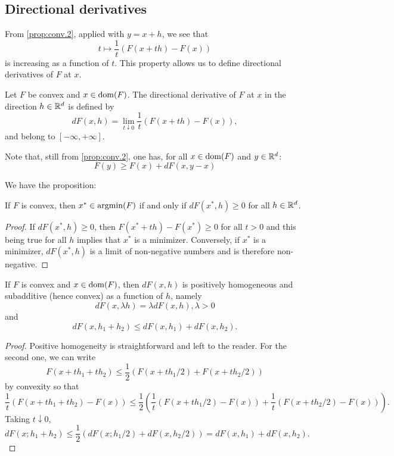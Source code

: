 \subsection{Directional derivatives}
From \cref{prop:conv.2}, applied with $y = x+h$, we see that 
\[
t \mapsto \frac{1}{t} (F(x+th) - F(x))
\]
is increasing as a function of $t$. This property allows us to define directional derivatives of $F$ at $x$. 
\begin{definition}
\label{def:directional}
Let $F$ be convex and $x\in \mathrm{dom}(F)$. The directional derivative of $F$ at $x$ in the direction $h\in {\mathbb{R}}^d$ is defined by
\begin{equation}
\label{eq:directional}
dF(x, h) = \lim_{t\downarrow 0} \frac{1}{t} (F(x+th) - F(x)),
\end{equation}
and belong to $[-\infty, +\infty]$.
\end{definition}
Note that, still from \cref{prop:conv.2}, one has, for all $x\in \mathrm{dom}(F)$ and $y\in {\mathbb{R}}^d$:
\begin{equation}
\label{eq:directional.sub}
F(y) \geq F(x) + dF(x, y-x)
\end{equation}

We have the proposition:
\begin{proposition}
\label{prop:directional.minimum}
If $F$ is convex, then $x^* \in \operatorname*{argmin}(F)$ if and only if $dF(x^*,h) \geq 0$ for all $h\in {\mathbb{R}}^d$.
\end{proposition}
\begin{proof}
If $dF(x^*,h) \geq 0$, then $F(x^*+th) - F(x^*) \geq 0$ for all $t>0$ and this being true for all $h$ implies that $x^*$ is a minimizer. Conversely, if $x^*$ is a minimizer, $dF(x^*, h)$ is a limit of non-negative numbers and is therefore non-negative. 
\end{proof}

\begin{proposition}
\label{prop:directional.convex}
If $F$ is convex and $x\in\mathrm{dom}(F)$, then $dF(x, h)$ is positively homogeneous and subadditive (hence convex) as a function of $h$, namely
\[
dF(x, \lambda h)  = \lambda dF(x, h), \lambda>0
\]
and
\[
dF(x, h_1+h_2) \leq dF(x, h_1) + dF(x, h_2).
\]
\end{proposition}
\begin{proof}
Positive homogeneity is straightforward and left to the reader. For the second one, we can write
\[
F(x+th_1 + th_2) \leq \frac12 (F(x+th_1/2) + F(x+th_2/2))
\]
by convexity so that
\[
\frac1t(F(x+th_1 + th_2)-F(x)) \leq \frac12 \left(\frac1t (F(x+th_1/2)-F(x)) + \frac1t(F(x+th_2/2) - F(x))\right).
\]
Taking $t\downarrow 0$, 
\[
dF(x;h_1+h_2) \leq \frac12 (dF(x; h_1/2) + dF(x, h_2/2)) = dF(x, h_1) + dF(x, h_2).
\]
\end{proof}

